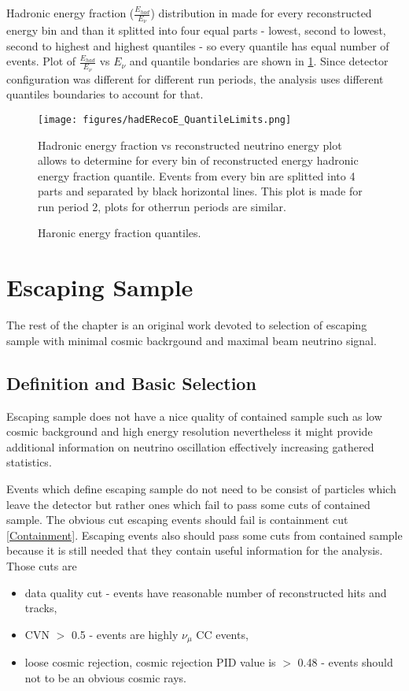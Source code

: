 Hadronic energy fraction ($\frac{E_{had}}{E_\nu}$) distribution in made for every reconstructed energy
bin and than it splitted into four equal parts - lowest, second to lowest, second to highest and highest
quantiles - so every quantile has equal number of events. Plot of $\frac{E_{had}}{E_\nu}$ vs $E_\nu$ and 
quantile bondaries are shown in \ref{fig:hadE_Quant}. Since detector configuration was different for 
different run periods, the analysis uses different quantiles boundaries to account for that. 
\begin{figure}[h]
\centering
\texttt{[image: figures/hadERecoE\_QuantileLimits.png]}
\caption{Haronic energy fraction quantiles.}
{Hadronic energy fraction vs reconstructed neutrino energy plot allows to determine for every bin of
reconstructed energy hadronic energy fraction quantile. Events from every bin are splitted into 4 parts
and separated by black horizontal lines. This plot is made for run period 2, plots for otherrun periods 
are similar.}
\label{fig:hadE_Quant}
\end{figure}

\section{Escaping Sample} \label{esc_sec}
The rest of the chapter is an original work devoted to selection of escaping sample with minimal
cosmic backrgound and maximal beam neutrino signal.

\subsection{Definition and Basic Selection} \label{base_cut}
Escaping sample does not have a nice quality of contained sample such as low cosmic background and
high energy resolution nevertheless it might provide additional information on neutrino oscillation
effectively increasing gathered statistics. 

Events which define escaping sample do not need to be consist of particles which leave the detector but
rather ones which fail to pass some cuts of contained sample. The obvious cut escaping events should 
fail is containment cut \ref{Containment}. Escaping events also should pass some cuts from contained 
sample because it is still needed that they contain useful information for the analysis. Those cuts are
\begin{itemize}
\item data quality cut - events have reasonable number of reconstructed hits and tracks,
\item CVN $>$ 0.5 - events are highly $\nu_\mu$ CC events,
\item loose cosmic rejection, cosmic rejection PID value is $>$ 0.48 - events should not to be an obvious 
cosmic rays.
\end{itemize}


